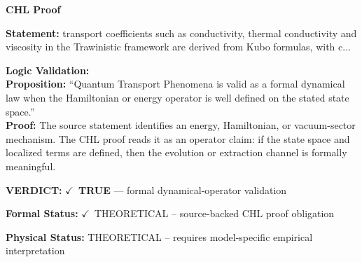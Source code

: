 \vspace{0.45em}
\noindent\textbf{CHL Proof}\par
\textbf{Statement:} transport coefficients such as conductivity, thermal conductivity and viscosity in the
Trawinistic framework are derived from Kubo formulas, with c...

\textbf{Logic Validation:}\\
\textbf{Proposition:} ``Quantum Transport Phenomena is valid as a formal dynamical law when the Hamiltonian or
energy operator is well defined on the stated state space.''\\
\textbf{Proof:} The source statement identifies an energy, Hamiltonian, or vacuum-sector mechanism. The
CHL proof reads it as an operator claim: if the state space and localized terms are
defined, then the evolution or extraction channel is formally meaningful.

\textbf{VERDICT:} \ensuremath{\checkmark}\ \textbf{TRUE} --- formal dynamical-operator validation

\textbf{Formal Status:} \ensuremath{\checkmark}\ THEORETICAL -- source-backed CHL proof obligation

\textbf{Physical Status:} THEORETICAL -- requires model-specific empirical interpretation
\par\vspace{0.45em}
\par
\ifTZPDarkEdition
{}
\fi
\endgroup
\endgroup
